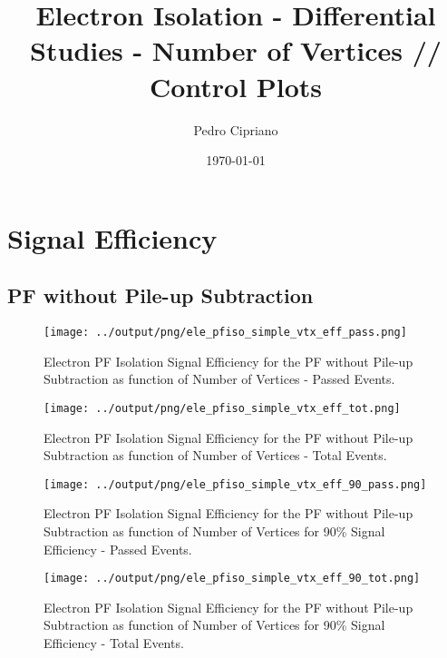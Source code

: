 \documentclass[11pt]{book}
\begin{document}
         
 
 \author{Pedro Cipriano}
 \date{\today}
 \title{Electron Isolation - Differential Studies - Number of Vertices // Control Plots}

\maketitle

\tableofcontents

\chapter{Signal Efficiency}
\section{PF without Pile-up Subtraction}
\begin{figure}[htb]
\centering
\texttt{[image: ../output/png/ele\_pfiso\_simple\_vtx\_eff\_pass.png]}
\caption{Electron PF Isolation Signal Efficiency for the PF without Pile-up Subtraction as function of Number of Vertices - Passed Events.}
\label{fig:ele_pfiso_vtx_eff_simple_pass}
\end{figure}

\begin{figure}[htb]
\centering
\texttt{[image: ../output/png/ele\_pfiso\_simple\_vtx\_eff\_tot.png]}
\caption{Electron PF Isolation Signal Efficiency for the PF without Pile-up Subtraction as function of Number of Vertices - Total Events.}
\label{fig:ele_pfiso_vtx_eff_simple_tot}
\end{figure}

\begin{figure}[htb]
\centering
\texttt{[image: ../output/png/ele\_pfiso\_simple\_vtx\_eff\_90\_pass.png]}
\caption{Electron PF Isolation Signal Efficiency for the PF without Pile-up Subtraction as function of Number of Vertices for 90\% Signal Efficiency - Passed Events.}
\label{fig:ele_pfiso_vtx_eff_simple_eff_90_pass}
\end{figure}

\begin{figure}[htb]
\centering
\texttt{[image: ../output/png/ele\_pfiso\_simple\_vtx\_eff\_90\_tot.png]}
\caption{Electron PF Isolation Signal Efficiency for the PF without Pile-up Subtraction as function of Number of Vertices for 90\% Signal Efficiency - Total Events.}
\label{fig:ele_pfiso_vtx_eff_simple_eff_90_tot}
\end{figure}
\end{document}
